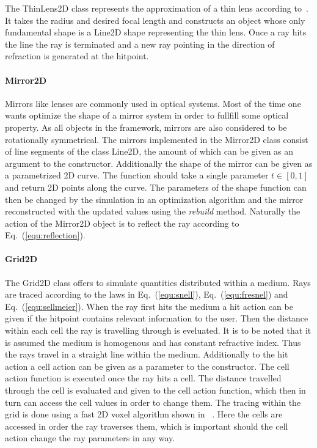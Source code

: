\documentclass[a4paper,10pt]{article}
\newcommand{\equref}[1]{Eq.~(\ref{#1})}
\begin{document}
    The ThinLens2D class represents the approximation of a thin lens
    according to~\cite{thin_lens}.
    It takes the radius and desired focal length and constructs
    an object whose only fundamental shape is a Line2D shape representing
    the thin lens.
    Once a ray hits the line the ray is terminated and a new ray pointing
    in the direction of refraction is generated at the hitpoint.

    \paragraph{Mirror2D}

    Mirrors like lenses are commonly used in optical systems.
    Most of the time one wants optimize the shape of a mirror system
    in order to fullfill some optical property.
    As all objects in the framework, mirrors are also considered to be
    rotationally symmetrical.
    The mirrors implemented in the Mirror2D class consist of line segments
    of the class Line2D, the amount of which can be given as an argument
    to the constructor.
    Additionally the shape of the mirror can be given as a parametrized
    2D curve.
    The function should take a single parameter $t \in [0, 1]$ and return
    2D points along the curve.
    The parameters of the shape function can then be changed by the simulation
    in an optimization algorithm and the mirror reconstructed with the
    updated values using the \emph{rebuild} method.
    Naturally the action of the Mirror2D object is to reflect the ray
    according to \equref{equ:reflection}.
    
    \paragraph{Grid2D}

    The Grid2D class offers to simulate quantities distributed within
    a medium.
    Rays are traced according to the laws in \equref{equ:snell},
    \equref{equ:fresnel} and \equref{equ:sellmeier}.
    When the ray first hits the medium a hit action can be given if
    the hitpoint contains relevant information to the user.
    Then the distance within each cell the ray is travelling through
    is eveluated.
    It is to be noted that it is assumed the medium is homogenous and
    has constant refractive index.
    Thus the rays travel in a straight line within the medium.
    Additionally to the hit action a cell action can be given as a
    parameter to the constructor.
    The cell action function is executed once the ray hits a cell.
    The distance travelled through the cell is evaluated and given to the
    cell action function, which then in turn can access the cell
    values in order to change them.
    The tracing within the grid is done using a fast 2D voxel algorithm
    shown in ~\cite{voxel}.
    Here the cells are accessed in order the ray traverses them, which
    is important should the cell action change the ray parameters in
    any way.
    
\end{document}
